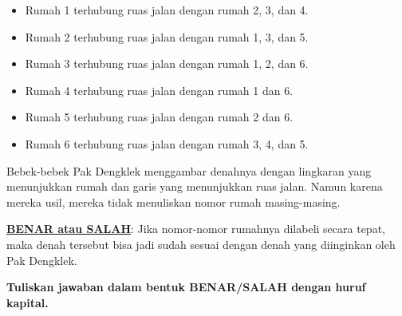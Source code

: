 \documentclass[a4paper]{article}
\begin{document}
\begin{enumerate}
    \begin{itemize}
        \item Rumah 1 terhubung ruas jalan dengan rumah 2, 3, dan 4.
        \item Rumah 2 terhubung ruas jalan dengan rumah 1, 3, dan 5.
        \item Rumah 3 terhubung ruas jalan dengan rumah 1, 2, dan 6.
        \item Rumah 4 terhubung ruas jalan dengan rumah 1 dan 6.
        \item Rumah 5 terhubung ruas jalan dengan rumah 2 dan 6.
        \item Rumah 6 terhubung ruas jalan dengan rumah 3, 4, dan 5.
    \end{itemize}
    
    Bebek-bebek Pak Dengklek menggambar denahnya dengan lingkaran yang menunjukkan rumah dan garis yang menunjukkan ruas jalan. Namun karena mereka usil, mereka tidak menuliskan nomor rumah masing-masing.
    \begin{center}
    \end{center}
    \textbf{\underline{BENAR atau SALAH}}: Jika nomor-nomor rumahnya dilabeli secara tepat, maka denah tersebut bisa jadi sudah sesuai dengan denah yang diinginkan oleh Pak Dengklek.
    
    \textbf{Tuliskan jawaban dalam bentuk BENAR/SALAH dengan huruf kapital.}
    
    
\end{enumerate}
\end{document}
